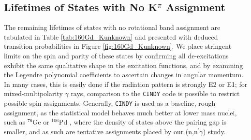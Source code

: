 \subsection{Lifetimes of States with No K$^\pi$ Assignment}
The remaining lifetimes of states with no rotational band assignment are tabulated in Table \ref{tab:160Gd_Kunknown} and presented with deduced transition probabilities in Figure \ref{fig:160Gd_Kunknown}. We place stringent limits on the spin and parity of these states by confirming all de-excitations exhibit the same qualitative shape in the excitation functions, and by examining the Legendre polynomial coefficients to ascertain changes in angular momentum. In many cases, this is easily done if the radiation pattern is strongly E2 or E1; for mixed-multipolarity $\gamma$ rays, comparison to the {\tt CINDY} code is possible to restrict possible spin assignments. Generally, {\tt CINDY} is used as a baseline, rough assignment, as the statistical model behaves much better at lower mass nuclei, such as $^{76}$Ge or $^{106}$Pd \cite{Crider_76Ge_cindy,Peters2016_Pdshapecoex}, where the density of states above the pairing gap is smaller, and as such are tentative assignments placed by our (n,n$^\prime\gamma$) study.

